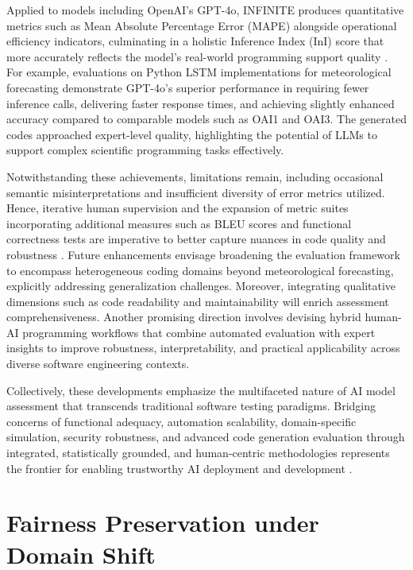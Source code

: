 \documentclass[sigconf]{acmart}
\begin{document}
Applied to models including OpenAI’s GPT-4o, INFINITE produces quantitative metrics such as Mean Absolute Percentage Error (MAPE) alongside operational efficiency indicators, culminating in a holistic Inference Index (InI) score that more accurately reflects the model’s real-world programming support quality \cite{ref9}. For example, evaluations on Python LSTM implementations for meteorological forecasting demonstrate GPT-4o’s superior performance in requiring fewer inference calls, delivering faster response times, and achieving slightly enhanced accuracy compared to comparable models such as OAI1 and OAI3. The generated codes approached expert-level quality, highlighting the potential of LLMs to support complex scientific programming tasks effectively.

Notwithstanding these achievements, limitations remain, including occasional semantic misinterpretations and insufficient diversity of error metrics utilized. Hence, iterative human supervision and the expansion of metric suites incorporating additional measures such as BLEU scores and functional correctness tests are imperative to better capture nuances in code quality and robustness \cite{ref9}. Future enhancements envisage broadening the evaluation framework to encompass heterogeneous coding domains beyond meteorological forecasting, explicitly addressing generalization challenges. Moreover, integrating qualitative dimensions such as code readability and maintainability will enrich assessment comprehensiveness. Another promising direction involves devising hybrid human-AI programming workflows that combine automated evaluation with expert insights to improve robustness, interpretability, and practical applicability across diverse software engineering contexts.

Collectively, these developments emphasize the multifaceted nature of AI model assessment that transcends traditional software testing paradigms. Bridging concerns of functional adequacy, automation scalability, domain-specific simulation, security robustness, and advanced code generation evaluation through integrated, statistically grounded, and human-centric methodologies represents the frontier for enabling trustworthy AI deployment and development \cite{ref1,ref2,ref3,ref9,ref27,ref29,ref30,ref31,ref32}.

\section{Fairness Preservation under Domain Shift}
\end{document}
